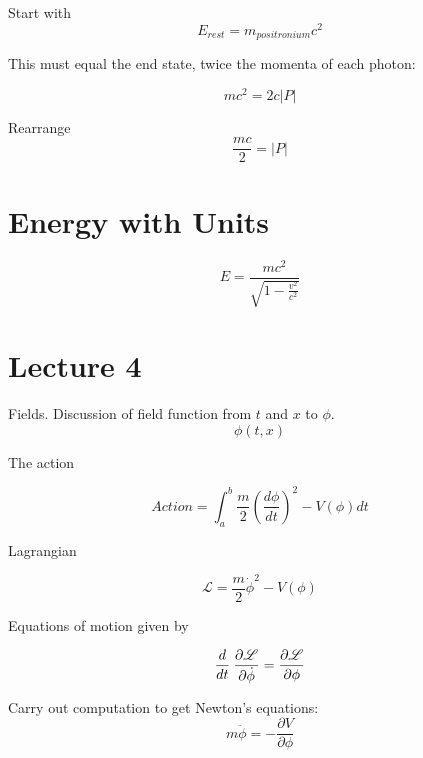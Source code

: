 \documentclass{article}
\begin{document}
Start with
\begin{equation}
E_{rest} = m_{positronium} c^2
\end{equation}

This must equal the end state, twice the momenta of each photon:

\begin{equation}
m c^2 = 2 c |P|
\end{equation}

Rearrange
\begin{equation}
\frac{m c}{2} = |P|
\end{equation}

\section{Energy with Units}

\begin{equation}
E = \frac{m c^2}{\sqrt{1 - \frac{v^2}{c^2}}}
\end{equation}

\section{Lecture 4}

Fields. Discussion of field function from $t$ and $x$ to $\phi$.
\begin{equation}
\phi(t, x)
\end{equation}

The action

\begin{equation}
Action = \int_a^b \frac{m}{2}\left( \frac{d\phi}{dt} \right)^2 - V(\phi) dt
\end{equation}

Lagrangian

\begin{equation}
\mathscr{L} = \frac{m}{2} \dot \phi^{2} - V(\phi)
\end{equation}

Equations of motion given by

\begin{equation}
\frac{d}{dt} \: \frac{\partial \mathscr{L}}{\partial \dot \phi} =\\
\frac{\partial \mathscr{L}}{\partial \phi}
\end{equation}

Carry out computation to get Newton's equations:
\begin{equation}
m \ddot \phi = - \frac{\partial V}{\partial \phi}
\end{equation}
\end{document}
